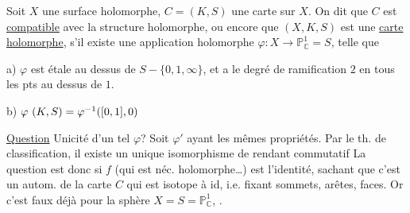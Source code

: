 Soit $X$ une surface holomorphe, $C=(K,S)$ une
carte sur $X$. On dit que $C$ est \uline{compatible}
avec la structure holomorphe, ou encore
que $(X,K,S)$ est une \uline{carte holomorphe},
s'il existe une application holomorphe
$\varphi:X\longrightarrow\mathbb{P}^1_{\mathbb{C}}=S$, telle que

a) $\varphi$ est étale au dessus de $S-\{0,1,\infty\}$, et
a le degré de ramification $2$ en tous les
pts au dessus de $1$.

b) $\deleted{\unsure{\varphi}}\ (K,S)=\varphi^{-1}([0,1],0)$

\uline{Question} Unicité d'un tel $\varphi$? Soit $\varphi'$ ayant
les mêmes propriétés. Par le th. de classification,
il existe un unique isomorphisme de
  rendant commutatif
La question est donc si $f$ (qui est néc.
holomorphe\ldots) est l'identité, sachant
que c'est un autom. de la carte $C$
qui est isotope à id, i.e. fixant sommets,
arêtes, faces. Or c'est faux déjà pour
la sphère $X=S=\mathbb{P}^1_{\mathbb{C}}$, .
